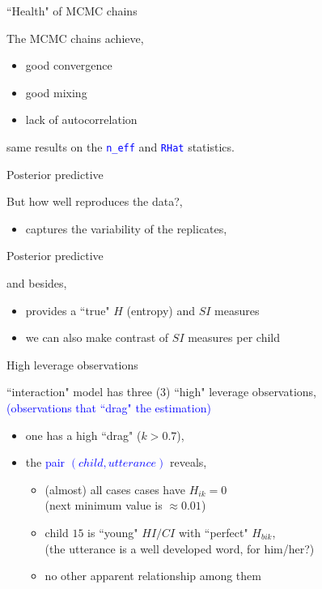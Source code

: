 %
%
\begin{lhframe}[rhgraphic={\texttt{[image: chains\_real2.pdf]}}]
	{``Health" of MCMC chains}
	
	The MCMC chains achieve,
	\begin{itemize}
		\item good convergence
		\item good mixing
		\item lack of autocorrelation
	\end{itemize}
	
	same results on the \textcolor{blue}{ \texttt{n\_eff} } and \textcolor{blue}{ \texttt{RHat} } statistics.
\end{lhframe}
%
%
\begin{lhframe}[rhgraphic={\texttt{[image: posterior\_predictive\_real1.pdf]}}]
	{Posterior predictive}
	
	But how well reproduces the data?,
	\begin{itemize}
		\item captures the variability of the replicates,
	\end{itemize}
\end{lhframe}
%
%
\begin{lhframe}[rhgraphic={\texttt{[image: posterior\_predictive\_real2.pdf]}}]
	{Posterior predictive}
	
	and besides,
	\begin{itemize}
		\item provides a ``true" $H$ (entropy) and $SI$ measures
		\item we can also make contrast of $SI$ measures per child
	\end{itemize}
\end{lhframe}
%
%
\begin{lhframe}[rhgraphic={\texttt{[image: outliers.pdf]}}]
	{High leverage observations}
	
	``interaction" model has three (3) ``high" leverage observations, \\
	{\small \textcolor{blue}{(observations that ``drag" the estimation)} }
	\begin{itemize}
		\item one has a high ``drag" ($k>0.7$),
		\item the \textcolor{blue}{pair $(child, utterance)$} reveals,
		\begin{itemize}
			\item (almost) all cases cases have $H_{ik}=0$ \\
			{\small (next minimum value is $\approx 0.01$)}
			\item child $15$ is ``young" $HI/CI$ with ``perfect" $H_{bik}$, \\
			{\small (the utterance is a well developed word, for him/her?)}
			\item no other apparent relationship among them
		\end{itemize}
	\end{itemize}
\end{lhframe}
%
%
